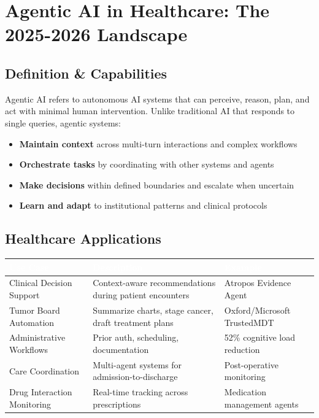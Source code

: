\documentclass[11pt,a4paper]{article}
\begin{document}
\vspace{8pt}

\section{Agentic AI in Healthcare: The 2025-2026 Landscape}

\subsection{Definition \& Capabilities}

Agentic AI refers to autonomous AI systems that can perceive, reason, plan, and act with minimal human intervention. Unlike traditional AI that responds to single queries, agentic systems:

\begin{itemize}
    \item \textbf{Maintain context} across multi-turn interactions and complex workflows
    \item \textbf{Orchestrate tasks} by coordinating with other systems and agents
    \item \textbf{Make decisions} within defined boundaries and escalate when uncertain
    \item \textbf{Learn and adapt} to institutional patterns and clinical protocols
\end{itemize}

\subsection{Healthcare Applications}

\begin{center}
\begin{tabular}{L{3.5cm}L{5cm}L{4.5cm}}
\toprule
{}
\textcolor{white}{\textbf{Use Case}} & \textcolor{white}{\textbf{Description}} & \textcolor{white}{\textbf{Example}} \\
\midrule
Clinical Decision Support & Context-aware recommendations during patient encounters & Atropos Evidence Agent \\
Tumor Board Automation & Summarize charts, stage cancer, draft treatment plans & Oxford/Microsoft TrustedMDT \\
Administrative Workflows & Prior auth, scheduling, documentation & 52\% cognitive load reduction \\
Care Coordination & Multi-agent systems for admission-to-discharge & Post-operative monitoring \\
Drug Interaction Monitoring & Real-time tracking across prescriptions & Medication management agents \\
\bottomrule
\end{tabular}
\end{center}
\end{document}
